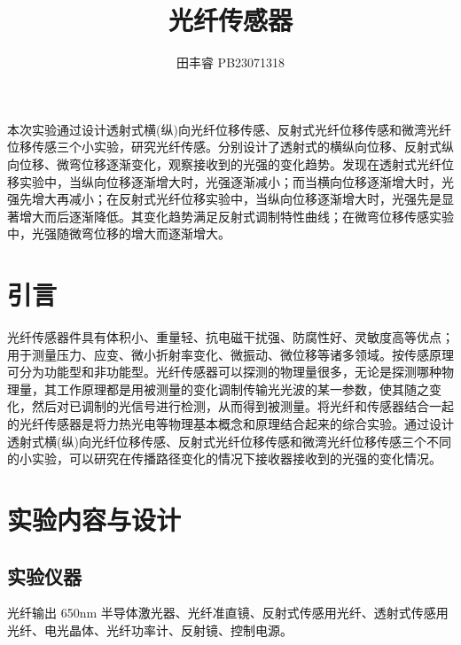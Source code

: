 \documentclass[UTF8]{ctexart}
\title{\textbf{\songti\zihao{-2}光纤传感器}}
\author{\kaishu\zihao{-4}田丰睿    PB23071318}
\begin{document}
\maketitle  

\kaishu{} 
本次实验通过设计透射式横(纵)向光纤位移传感、反射式光纤位移传感和微湾光纤位移传感三个小实验，研究光纤传感。分别设计了透射式的横纵向位移、反射式纵向位移、微弯位移逐渐变化，观察接收到的光强的变化趋势。发现在透射式光纤位移实验中，当纵向位移逐渐增大时，光强逐渐减小；而当横向位移逐渐增大时，光强先增大再减小；在反射式光纤位移实验中，当纵向位移逐渐增大时，光强先是显著增大而后逐渐降低。其变化趋势满足反射式调制特性曲线；在微弯位移传感实验中，光强随微弯位移的增大而逐渐增大。\\
\vspace{1em}

\vspace{1em}


\section{引言}
光纤传感器件具有体积小、重量轻、抗电磁干扰强、防腐性好、灵敏度高等优点；用于测量压力、应变、微小折射率变化、微振动、微位移等诸多领域。按传感原理可分为功能型和非功能型。光纤传感器可以探测的物理量很多，无论是探测哪种物理量，其工作原理都是用被测量的变化调制传输光光波的某一参数，使其随之变化，然后对已调制的光信号进行检测，从而得到被测量。将光纤和传感器结合一起的光纤传感器是将力热光电等物理基本概念和原理结合起来的综合实验。通过设计透射式横(纵)向光纤位移传感、反射式光纤位移传感和微湾光纤位移传感三个不同的小实验，可以研究在传播路径变化的情况下接收器接收到的光强的变化情况。
\vspace{1em}

\section{实验内容与设计}

\subsection{实验仪器}
\par
光纤输出 650nm 半导体激光器、光纤准直镜、反射式传感用光纤、透射式传感用光纤、电光晶体、光纤功率计、反射镜、控制电源。
\end{document}
